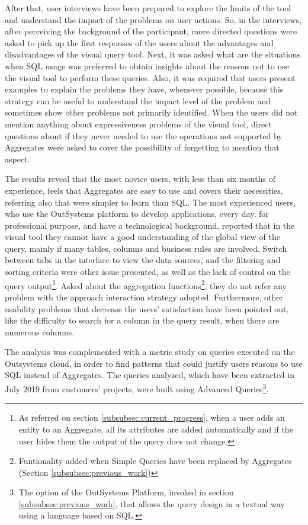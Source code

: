 After that, user interviews have been prepared to explore the limits of the tool and understand the impact of the problems on user actions. So, in the interviews, after perceiving the background of the participant, more directed questions were asked to pick up the first responses of the users about the advantages and disadvantages of the visual query tool. Next, it was asked what are the situations when \gls{SQL} usage was preferred to obtain insights about the reasons not to use the visual tool to perform these queries. Also, it was required that users present examples to explain the problems they have, whenever possible, because this strategy can be useful to understand the impact level of the problem and sometimes show other problems not primarily identified. When the users did not mention anything about expressiveness problems of the visual tool, direct questions about if they never needed to use the operations not supported by Aggregates were asked to cover the possibility of forgetting to mention that aspect.

The results reveal that the most novice users, with less than six months of experience, feels that Aggregates are easy to use and covers their necessities, referring also that were simpler to learn than \gls{SQL}. The most experienced users, who use the OutSystems platform to develop applications, every day, for professional purpose, and have a technological background, reported that in the visual tool they cannot have a good understanding of the global view of the query, mainly if many tables, columns and business rules are involved. Switch between tabs in the interface to view the data sources, and the filtering and sorting criteria were other issue presented, as well as the lack of control on the query output\footnote{As referred on section \ref{subsubsec:current_progress}, when a user adds an entity to an Aggregate, all its attributes are added automatically and if the user hides them the output of the query does not change.}. Asked about the aggregation functions\footnote{Funtionality added when Simple Queries have been replaced by Aggregates (Section \ref{subsubsec:previous_work})}, they do not refer any problem with the approach interaction strategy adopted. Furthermore, other usability problems that decrease the users’ satisfaction have been pointed out, like the difficulty to search for a column in the query result, when there are numerous columns.

The analysis was complemented with a metric study on queries executed on the Outsystems cloud, in order to find patterns that could justify users reasons to use \gls{SQL} instead of Aggregates. The queries analyzed, which have been extracted in July 2019 from customers’ projects, were built using Advanced Queries\footnote{The option of the OutSystems Platform, invoked in section \ref{subsubsec:previous_work}, that allows the query design in a textual way using a language based on \gls{SQL}.}.

